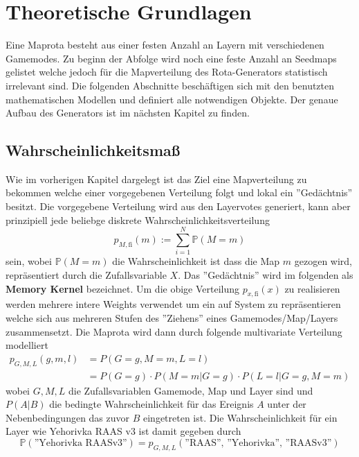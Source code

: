 \section{Theoretische Grundlagen}
    Eine Maprota besteht aus einer festen Anzahl an Layern mit verschiedenen Gamemodes. 
    Zu beginn der Abfolge wird noch eine feste Anzahl an Seedmaps gelistet welche jedoch für die Mapverteilung des Rota-Generators statistisch irrelevant sind.
    Die folgenden Abschnitte beschäftigen sich mit den benutzten mathematischen Modellen und definiert alle notwendigen Objekte.
    Der genaue Aufbau des Generators ist im nächsten Kapitel zu finden.
    \subsection{Wahrscheinlichkeitsmaß}
        Wie im vorherigen Kapitel dargelegt ist das Ziel eine Mapverteilung zu bekommen welche einer vorgegebenen Verteilung folgt und lokal ein ''Gedächtnis'' besitzt.
        Die vorgegebene Verteilung wird aus den Layervotes generiert, kann aber prinzipiell jede beliebge diskrete Wahrscheinlichkeitsverteilung 
        \begin{equation}
            p_{M,\text{fi}}(m) := \sum_{i=1}^N \mathbb{P}(M=m)
        \end{equation}
        sein, wobei $\mathbb{P}(M=m)$ die Wahrscheinlichkeit ist dass die Map $m$ gezogen wird, repräsentiert durch die Zufallsvariable $X$.
        Das ''Gedächtnis'' wird im folgenden als \textbf{Memory Kernel} bezeichnet.
        Um die obige Verteilung $p_{x,\text{fi}}(x)$ zu realisieren werden mehrere intere Weights verwendet um ein auf System zu repräsentieren welche sich aus mehreren Stufen des ''Ziehens'' eines Gamemodes/Map/Layers zusammensetzt.
        Die Maprota wird dann durch folgende multivariate Verteilung modelliert
        \begin{align}
            p_{G,M,L}(g,m,l)    &= P(G=g, M=m, L=l) \\
                                &= P(G=g)\cdot P(M=m|G=g) \cdot P(L=l|G=g, M=m)
        \end{align}
        wobei $G,M,L$ die Zufallsvariablen \glqq{}Gamemode\grqq{}, \glqq{}Map\grqq{} und \glqq{}Layer\grqq{} sind und $P(A|B)$ die bedingte Wahrscheinlichkeit für das Ereignis $A$ unter der Nebenbedingungen das zuvor $B$ eingetreten ist.
        Die Wahrscheinlichkeit für ein Layer wie \glqq{}Yehorivka RAAS v3\grqq{} ist damit gegeben durch 
        \begin{equation*}
            \mathbb{P}(\text{''Yehorivka RAASv3''}) = p_{G,M,L}(\text{''RAAS'', ''Yehorivka'', ''RAASv3''})
        \end{equation*}
